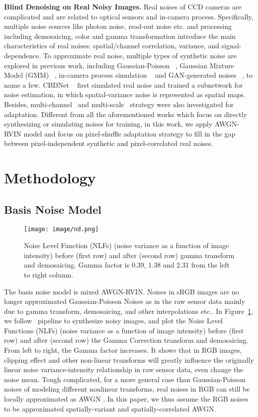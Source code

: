 \documentclass[letterpaper]{article} \usepackage{aaai20}  \usepackage{times}  \usepackage{helvet} \usepackage{courier}  \usepackage{comment}
\begin{document}
\textbf{Blind Denoising on Real Noisy Images.}
Real noises of CCD cameras are complicated and are related to optical sensors and in-camera process. Specifically, multiple noise sources like photon noise, read-out noise etc. and processing including demosaicing, color and gamma transformation introduce the main characteristics of real noises: spatial/channel correlation, variance, and signal-dependence. To approximate real noise, multiple types of synthetic noise are explored in previous work, including Gaussian-Poisson ~\cite{foi2008practical,liu2014practical}, Gaussian Mixture Model (GMM) ~\cite{zhu2016noise}, in-camera process simulation ~\cite{liu2008automatic,guo2018toward} and GAN-generated noises ~\cite{chen2018image}, to name a few. CBDNet ~\cite{guo2018toward} first simulated real noise and trained a subnetwork for noise estimation, in which spatial-variance noise is represented as spatial maps. Besides, multi-channel~\cite{xu2017multi,guo2018toward} and multi-scale~\cite{lebrun2015multiscale,yu2015multi} strategy were also investigated for adaptation. Different from all the aforementioned works which focus on directly synthesizing or simulating noises for training, in this work, we apply AWGN-RVIN model and focus on pixel-shuffle adaptation strategy to fill in the gap between pixel-independent synthetic and pixel-correlated real noises.  \section{Methodology}
\subsection{Basis Noise Model}
\begin{figure}[t]
	\centering
		\texttt{[image: image/nd.png]}
	\caption{Noise Level Function (NLFs) (noise variance as a function of image intensity) before (first row) and after (second row) gamma transform and demosaicing. Gamma factor is 0.39, 1.38 and 2.31 from the left to right column. }
	\label{fig:nd}
\end{figure}
The basis noise model is mixed AWGN-RVIN. Noises in sRGB images are no longer approximated Gaussian-Poisson Noises as in the raw sensor data mainly due to gamma transform, demosaicing, and other interpolations etc.. In Figure~\ref{fig:nd}, we follow~\cite{liu2008automatic} pipeline to synthesize noisy images, and plot the Noise Level Functions (NLFs) (noise variance as a function of image intensity) before (first row) and after (second row) the Gamma Correction transform and demosaicing. From left to right, the Gamma factor increases. It shows that in RGB images, clipping effect and other non-linear transforms will greatly influence the originally linear noise variance-intensity relationship in raw sensor data, even change the noise mean. Tough complicated, for a more general case than Gaussian-Poisson noises of modeling different nonlinear transforms, real noises in RGB can still be locally approximated as AWGN \cite{zhang2018ffdnet,lee1980refined,xu2018trilateral}. In this paper, we thus assume the RGB noises to be approximated spatially-variant and spatially-correlated AWGN.
\end{document}
